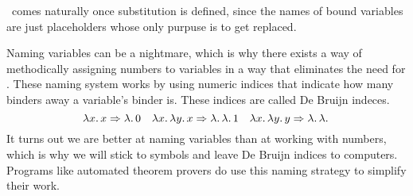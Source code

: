 \documentclass[12pt]{book}
\begin{document}
\begin{remark}
  \aequiv \ comes naturally once substitution is defined, since the names of bound variables are just placeholders whose only purpuse is to get replaced.
\end{remark}
Naming variables can be a nightmare, which is why there exists a way of methodically assigning numbers to variables in a way that eliminates the need for \aequiv. These naming system works by using numeric indices that indicate how many binders away a variable’s binder is. These indices are called De Bruijn indeces.
\[
  \lambda x.\, x \Rightarrow \lambda.\, 0 \quad \lambda x.\, \lambda y.\, x \Rightarrow \lambda.\, \lambda.\, 1 \quad \lambda x.\, \lambda y.\, y \Rightarrow \lambda.\, \lambda.\,
\]
It turns out we are better at naming variables than at working with numbers, which is why we will stick to symbols and leave De Bruijn indices to computers. Programs like automated theorem provers do use this naming strategy to simplify their work.
\end{document}
